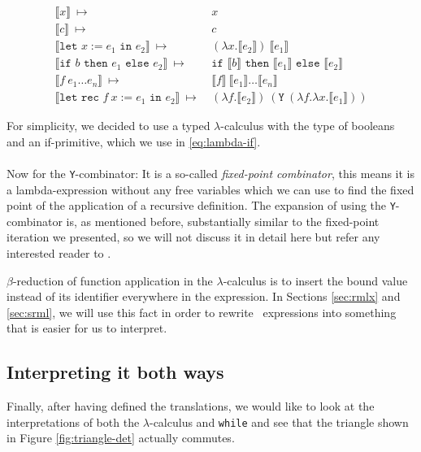 \documentclass[11pt, leqno, titlepage]{article}
\theoremstyle{definition}
\begin{document}
\begin{align}
  \label{fig:fun-to-lambda}
  \llbracket x \rrbracket~\mapsto~
  & x\\
  \llbracket c\rrbracket~\mapsto~
  & c\\
  \llbracket\texttt{let }x := e_1\texttt{ in }e_2 \rrbracket~\mapsto~
  & (\lambda x.\llbracket e_2\rrbracket)~\llbracket e_1\rrbracket \\
  \llbracket \texttt{if $b$ then $e_1$ else }e_2 \rrbracket~\mapsto~
  &\texttt{if } \llbracket b\rrbracket \texttt{ then }\llbracket e_1\rrbracket
    \texttt{ else }\llbracket e_2\rrbracket \label{eq:lambda-if}\\
 \llbracket f~e_1\dots e_n \rrbracket~\mapsto~
  & \llbracket f\rrbracket~\llbracket e_1\rrbracket \dots \llbracket e_n\rrbracket\\
  \llbracket \texttt{let rec }f~x:= e_1 \texttt{ in } e_2\rrbracket ~\mapsto~
  & (\lambda f.\llbracket e_2\rrbracket)~(\texttt{Y}~
    (\lambda f.\lambda x. \llbracket e_1\rrbracket))
\end{align}

For simplicity, we decided to use a typed $\lambda$-calculus with the type of
booleans and an if-primitive, which we use in \ref{eq:lambda-if}.\\
\\
Now for the \texttt{Y}-combinator: It is a so-called \emph{fixed-point combinator},
this means it is a lambda-expression without any free variables which we can use to
find the fixed point of the application of a recursive definition. The expansion of
using the \texttt{Y}-combinator is, as mentioned before, substantially similar to the
fixed-point iteration we presented, so we will not discuss it in detail here but
refer any interested reader to \cite{y-combinator}. 

$\beta$-reduction of function application in the $\lambda$-calculus is to insert the
bound value instead of its identifier everywhere in the expression. In Sections
\ref{sec:rmlx} and \ref{sec:srml}, we will use this fact in order to rewrite \rml\
expressions into something that is easier for us to interpret. 

\subsection{Interpreting it both ways}\label{sec:lambda-interp} 
Finally, after having defined the translations, we would like to look at the
interpretations of both the $\lambda$-calculus and \texttt{while} and see that the
triangle shown in Figure \ref{fig:triangle-det} actually commutes.
\end{document}
